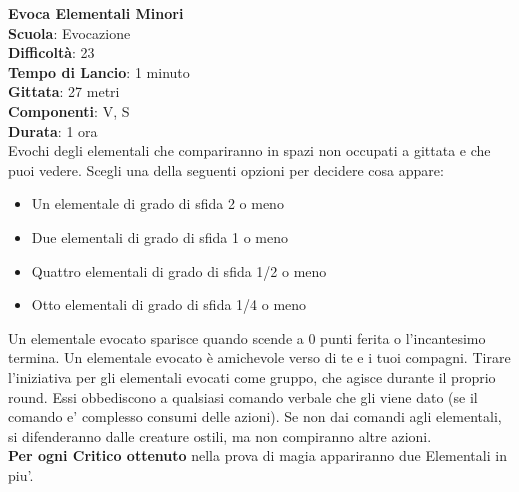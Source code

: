 \begin{multicols}{2}
\medskip\textbf{Evoca Elementali Minori}\\
\textbf{Scuola}: Evocazione\\
\textbf{Difficoltà}: 23\\
\textbf{Tempo di Lancio}: 1 minuto\\
\textbf{Gittata}: 27 metri\\
\textbf{Componenti}: V, S\\
\textbf{Durata}: 1 ora\\
Evochi degli elementali che compariranno in spazi non occupati a gittata e che puoi vedere. Scegli una della seguenti opzioni per decidere cosa appare:
\begin{itemize}
\item Un elementale di grado di sfida 2 o meno
\item Due elementali di grado di sfida 1 o meno
\item Quattro elementali di grado di sfida 1/2 o meno
\item Otto elementali di grado di sfida 1/4 o meno
\end{itemize}
\medskip
Un elementale evocato sparisce quando scende a 0 punti ferita o l'incantesimo termina. Un elementale evocato è amichevole verso di te e i tuoi compagni. Tirare l'iniziativa per gli elementali evocati come gruppo, che agisce durante il proprio round. Essi obbediscono a qualsiasi comando verbale che gli viene dato (se il comando e' complesso consumi delle azioni). Se non dai comandi agli elementali, si difenderanno dalle creature ostili, ma non compiranno altre azioni.\\
\textbf{Per ogni Critico ottenuto} nella prova di magia appariranno due Elementali in piu'.


\end{multicols}
